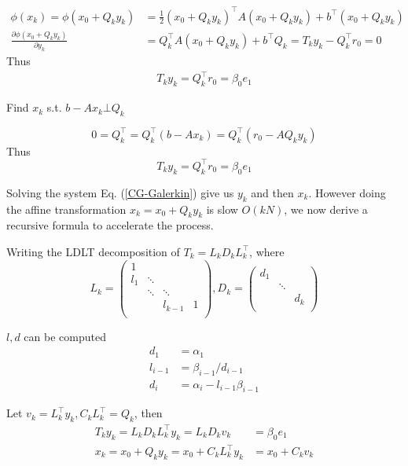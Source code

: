 \documentclass{article}
\begin{document}
\begin{align*}
\phi(x_k) = \phi(x_0 + Q_k y_k) &= \frac{1}{2}(x_0 + Q_k y_k)^\top A (x_0 + Q_k y_k) + b^\top (x_0 + Q_k y_k) \\
\frac{\partial \phi(x_0 + Q_k y_k)}{\partial y_k} &= Q_k^\top A (x_0 + Q_k y_k) + b^\top Q_k = T_k y_k - Q_k^\top r_0 = 0
\end{align*}
Thus
\begin{align}
T_k y_k = Q_k^\top r_0 = \beta_0 e_1 \label{CG-Galerkin}
\end{align}

\begin{center}
Find $x_k$ s.t. $b - Ax_k \bot Q_k$
\end{center}

$$0 = Q_k^\top = Q_k^\top(b - Ax_k) = Q_k^\top(r_0 - AQ_ky_k)$$
Thus
$$T_k y_k = Q_k^\top r_0 = \beta_0 e_1$$

Solving the system Eq. (\ref{CG-Galerkin}) give us $y_k$ and then $x_k$. However doing the affine transformation $x_k = x_0 + Q_k y_k$ is slow $O(kN)$, we now derive a recursive formula to accelerate the process.

Writing the LDLT decomposition of $T_k = L_kD_kL_k^\top$, where
$$L_k = \begin{pmatrix}
1       &       &    &   \\
l_1     &\ddots  &   &   \\
        &\ddots  &\ddots   &   \\
        &   &  l_{k-1} & 1 \\
\end{pmatrix}, D_k = \begin{pmatrix}
d_1 & &\\
 & \ddots & \\
 & & d_k \\
\end{pmatrix}$$

$l, d$ can be computed
\begin{align*}
d_1 &= \alpha_1 \\
l_{i-1} &= \beta_{i-1} / d_{i-1} \\
d_i &= \alpha_i - l_{i-1}\beta_{i-1}
\end{align*}

Let $v_k = L_k^\top y_k, C_kL_k^\top = Q_k$, then
\begin{align*}
T_k y_k = L_k D_k L_k^\top y_k = L_k D_k v_k &= \beta_0 e_1 \\
x_k = x_0 + Q_k y_k = x_0 + C_k L_k^\top y_k &= x_0 + C_k v_k
\end{align*}
\end{document}
